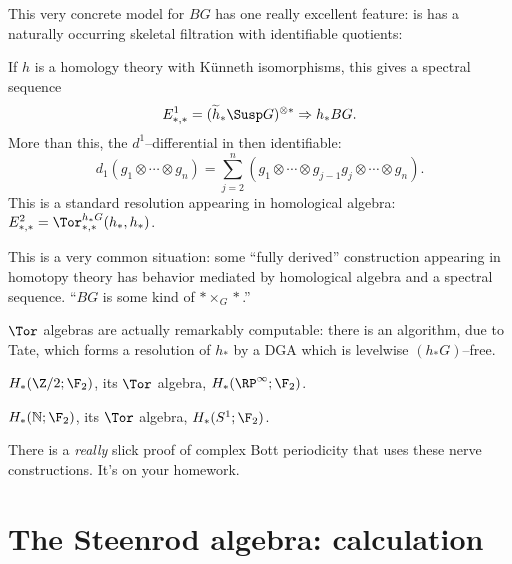 This very concrete model for $BG$ has one really excellent feature: is has a naturally occurring skeletal filtration with identifiable quotients:
\begin{center}
\end{center}
If $h$ is a homology theory with K\"unneth isomorphisms, this gives a spectral sequence \[E^1_{*, *} = (\widetilde h_* \Susp G)^{\otimes *} \Rightarrow h_* BG.\]  More than this, the $d^1$--differential in then identifiable: \[d_1(g_1 \otimes \cdots \otimes g_n) = \sum_{j=2}^n (g_1 \otimes \cdots \otimes g_{j-1} g_j \otimes \cdots \otimes g_n).\]  This is a standard resolution appearing in homological algebra: $E_{*, *}^2 = \Tor^{h_* G}_{*, *}(h_*, h_*)$.

\begin{remark}
This is a very common situation: some ``fully derived'' construction appearing in homotopy theory has behavior mediated by homological algebra and a spectral sequence.  ``$BG$ is some kind of $* \times_G *$.''
\end{remark}

$\Tor$ algebras are actually remarkably computable: there is an algorithm, due to Tate, which forms a resolution of $h_*$ by a DGA which is levelwise $(h_* G)$--free.

\begin{example}
$H_*(\Z/2; \F_2)$, its $\Tor$ algebra, $H_*(\RP^\infty; \F_2)$.
\end{example}

\begin{example}
$H_*(\mathbb N; \F_2)$, its $\Tor$ algebra, $H_*(S^1; \F_2)$.
\end{example}

\begin{remark}
There is a \emph{really} slick proof of complex Bott periodicity that uses these nerve constructions.  It's on your homework.
\end{remark}




\section{The Steenrod algebra: calculation}

